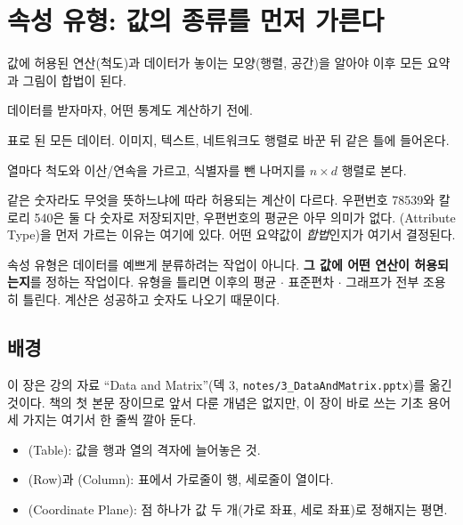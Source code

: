 \chapter{속성 유형: 값의 종류를 먼저 가른다}
\label{ch:attributes}

\begin{inbrief}
  \item[Why] 값에 허용된 연산(척도)과 데이터가 놓이는 모양(행렬, 공간)을
             알아야 이후 모든 요약과 그림이 합법이 된다.
  \item[When] 데이터를 받자마자, 어떤 통계도 계산하기 전에.
  \item[Where] 표로 된 모든 데이터. 이미지, 텍스트, 네트워크도 행렬로
               바꾼 뒤 같은 틀에 들어온다.
  \item[How] 열마다 척도와 이산/연속을 가르고, 식별자를 뺀 나머지를
             $n \times d$ 행렬로 본다.
\end{inbrief}

같은 숫자라도 무엇을 뜻하느냐에 따라 허용되는 계산이 다르다. 우편번호
78539와 칼로리 540은 둘 다 숫자로 저장되지만, 우편번호의 평균은 아무 의미가
없다. (Attribute Type)을 먼저 가르는 이유는 여기에 있다.
어떤 요약값이 \emph{합법}인지가 여기서 결정된다.

\begin{keyidea}
속성 유형은 데이터를 예쁘게 분류하려는 작업이 아니다. \textbf{그 값에 어떤
연산이 허용되는지}를 정하는 작업이다. 유형을 틀리면 이후의 평균 $\cdot$ 표준편차
$\cdot$ 그래프가 전부 조용히 틀린다. 계산은 성공하고 숫자도 나오기 때문이다.
\end{keyidea}

\section{배경}
\label{sec:attr-background}

이 장은 강의 자료 ``Data and Matrix''(덱 3,
\texttt{notes/3\_DataAndMatrix.pptx})를 옮긴 것이다. 책의 첫 본문 장이므로
앞서 다룬 개념은 없지만, 이 장이 바로 쓰는 기초 용어 세 가지는 여기서
한 줄씩 깔아 둔다.

\begin{itemize}
  \item {}(Table): 값을 행과 열의 격자에 늘어놓은 것.
  \item {}(Row)과 (Column): 표에서 가로줄이 행, 세로줄이
        열이다.
  \item {}(Coordinate Plane): 점 하나가 값 두 개(가로 좌표,
        세로 좌표)로 정해지는 평면.
\end{itemize}

